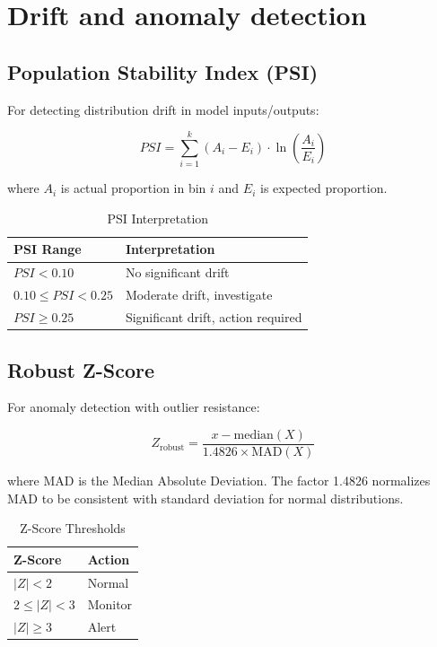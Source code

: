\section{Drift and anomaly detection}

\subsection{Population Stability Index (PSI)}

For detecting distribution drift in model inputs/outputs:

\begin{equation}
\boxed{
PSI = \sum_{i=1}^{k} (A_i - E_i) \cdot \ln\left(\frac{A_i}{E_i}\right)
}
\label{eq:psi}
\end{equation}

where $A_i$ is actual proportion in bin $i$ and $E_i$ is expected proportion.

\begin{table}[htbp]
\centering
\caption{PSI Interpretation}
\begin{tabular}{l l}
\toprule
\textbf{PSI Range} & \textbf{Interpretation} \\
\midrule
$PSI < 0.10$ & No significant drift \\
$0.10 \leq PSI < 0.25$ & Moderate drift, investigate \\
$PSI \geq 0.25$ & Significant drift, action required \\
\bottomrule
\end{tabular}
\end{table}

\subsection{Robust Z-Score}

For anomaly detection with outlier resistance:

\begin{equation}
\boxed{
Z_{\text{robust}} = \frac{x - \text{median}(X)}{1.4826 \times \text{MAD}(X)}
}
\label{eq:robust-z}
\end{equation}

where MAD is the Median Absolute Deviation. The factor 1.4826 normalizes MAD
to be consistent with standard deviation for normal distributions.

\begin{table}[htbp]
\centering
\caption{Z-Score Thresholds}
\begin{tabular}{l l}
\toprule
\textbf{Z-Score} & \textbf{Action} \\
\midrule
$|Z| < 2$ & Normal \\
$2 \leq |Z| < 3$ & Monitor \\
$|Z| \geq 3$ & Alert \\
\bottomrule
\end{tabular}
\end{table}

